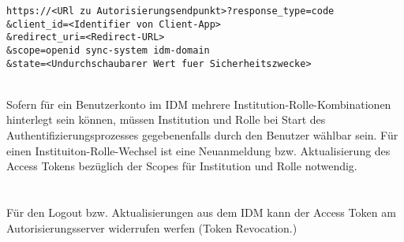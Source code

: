 \begin{lstlisting}
https://<URl zu Autorisierungsendpunkt>?response_type=code
&client_id=<Identifier von Client-App>
&redirect_uri=<Redirect-URL>
&scope=openid sync-system idm-domain
&state=<Undurchschaubarer Wert fuer Sicherheitszwecke>
\end{lstlisting}
\\
Sofern für ein Benutzerkonto im IDM mehrere Institution-Rolle-Kombinationen hinterlegt sein können, müssen Institution und Rolle bei Start des Authentifizierungsprozesses gegebenenfalls durch den Benutzer wählbar sein. 
Für einen Instituiton-Rolle-Wechsel ist eine Neuanmeldung bzw. Aktualisierung des Access Tokens bezüglich der Scopes für Institution und Rolle notwendig. \\
\\
\\
Für den Logout bzw. Aktualisierungen aus dem IDM kann der Access Token am Autorisierungsserver widerrufen werfen (Token Revocation.)